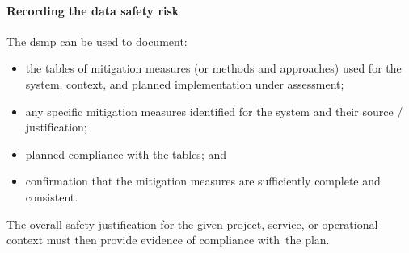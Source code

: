 \paragraph{Recording the data safety risk }
The \gls{dsmp} can be used to document:
\begin{itemize}
  \item the tables of \gls{mitigation} measures (or methods and approaches) used for the system, context, and planned implementation under assessment;
  \item any specific \gls{mitigation} measures identified for the system and their source / justification;
  \item planned compliance with the tables; and
  \item confirmation that the \gls{mitigation} measures are sufficiently complete and consistent.
\end{itemize}  
The overall safety justification for the given \cbstart project, service, or operational context must then provide evidence of compliance with\cbend\ the plan.
